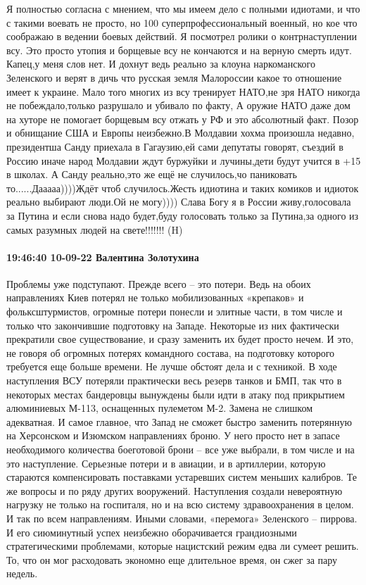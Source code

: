 Я полностью согласна с мнением, что мы имеем дело с полными идиотами, и что с
такими воевать не просто, но 100%
суперпрофессиональный военный, но кое что соображаю в ведении боевых действий.
Я посмотрел ролики о контрнаступлении всу. Это просто утопия и борщевые всу не
кончаются и на верную смерть идут. Капец,у меня слов нет. И дохнут ведь реально
за клоуна наркоманского Зеленского и верят в дичь что русская земля Малороссии
какое то отношение имеет к украине. Мало того многих из всу тренирует НАТО,не
зря НАТО никогда не побеждало,только разрушало и убивало по факту, А оружие
НАТО даже дом на хуторе не помогает борщевым всу отжать у РФ и это абсолютный
факт. Позор и обнищание США и Европы неизбежно.В Молдавии хохма произошла
недавно, президентша Санду приехала в Гагаузию,ей сами депутаты говорят,
съездий в Россию иначе народ Молдавии ждут буржуйки и лучины,дети будут учится
в +15 в школах. А Санду реально,это же ещё не случилось,чо паниковать
то......Дааааа))))Ждёт чтоб случилось.Жесть идиотина и таких комиков и идиоток
реально выбирают люди.Ой не могу)))) Слава Богу я в России живу,голосовала за
Путина и если снова надо будет,буду голосовать только за Путина,за одного из
самых разумных людей на свете!!!!!!! (H)


\paragraph{19:46:40 10-09-22 Валентина Золотухина}

Проблемы уже подступают. Прежде всего – это потери. Ведь на обоих направлениях Киев потерял не только мобилизованных «крепаков» и фольксштурмистов, огромные потери понесли и элитные части, в том числе и только что закончившие подготовку на Западе. Некоторые из них фактически прекратили свое существование, и сразу заменить их будет просто нечем. И это, не говоря об огромных потерях командного состава, на подготовку которого требуется еще больше времени.
Не лучше обстоят дела и с техникой. В ходе наступления ВСУ потеряли практически весь резерв танков и БМП, так что в некоторых местах бандеровцы вынуждены были идти в атаку под прикрытием алюминиевых М-113, оснащенных пулеметом М-2. Замена не слишком адекватная. И самое главное, что Запад не сможет быстро заменить потерянную на Херсонском и Изюмском направлениях броню. У него просто нет в запасе необходимого количества боеготовой брони – все уже выбрали, в том числе и на это наступление.
Серьезные потери и в авиации, и в артиллерии, которую стараются компенсировать поставками устаревших систем меньших калибров. Те же вопросы и по ряду других вооружений. Наступления создали невероятную нагрузку не только на госпиталя, но и на всю систему здравоохранения в целом.
И так по всем направлениям. Иными словами, «перемога» Зеленского – пиррова. И его сиюминутный успех неизбежно оборачивается грандиозными стратегическими проблемами, которые нацистский режим едва ли сумеет решить. То, что он мог расходовать экономно еще длительное время, он сжег за пару недель.

